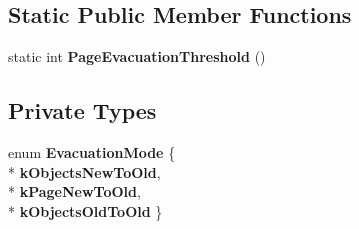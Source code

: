\subsection*{Static Public Member Functions}
\begin{DoxyCompactItemize}
\item 
static int {\bfseries Page\+Evacuation\+Threshold} ()\hypertarget{classv8_1_1internal_1_1_mark_compact_collector_1_1_evacuator_ac4be21dbd79163503544f3b8706eca8e}{}\label{classv8_1_1internal_1_1_mark_compact_collector_1_1_evacuator_ac4be21dbd79163503544f3b8706eca8e}

\end{DoxyCompactItemize}
\subsection*{Private Types}
\begin{DoxyCompactItemize}
\item 
enum {\bfseries Evacuation\+Mode} \{ \\*
{\bfseries k\+Objects\+New\+To\+Old}, 
\\*
{\bfseries k\+Page\+New\+To\+Old}, 
\\*
{\bfseries k\+Objects\+Old\+To\+Old}
 \}\hypertarget{classv8_1_1internal_1_1_mark_compact_collector_1_1_evacuator_a018a67b272bb601ce1de85b4f7aa5ae8}{}\label{classv8_1_1internal_1_1_mark_compact_collector_1_1_evacuator_a018a67b272bb601ce1de85b4f7aa5ae8}

\end{DoxyCompactItemize}
